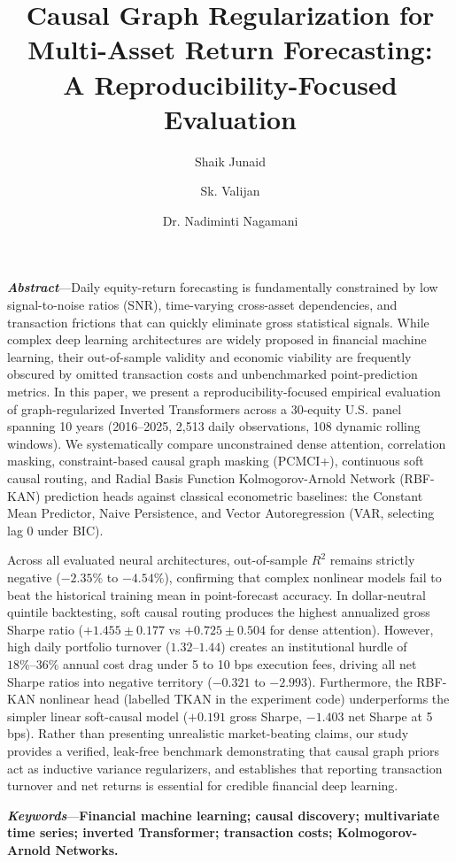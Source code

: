\documentclass[10pt,twocolumn,a4paper]{article}
\title{\fontsize{18pt}{22.5pt}\selectfont\bfseries Causal Graph Regularization for Multi-Asset Return Forecasting:\\[0.35em]\fontsize{13.5pt}{17.5pt}\selectfont\textbf{\color{navyblue}A Reproducibility-Focused Evaluation}}
\author[1]{Shaik Junaid}
\author[1]{Sk. Valijan}
\author[2]{Dr. Nadiminti Nagamani}
\affil[1]{Department of Data Science, VIT-AP University, Amaravati, Andhra Pradesh, India}
\affil[2]{School of Advanced Sciences, VIT-AP University, Amaravati, Andhra Pradesh, India}
\date{}
\begin{document}
\maketitle
\balance

\noindent\textbf{\textit{Abstract}}---Daily equity-return forecasting is fundamentally constrained by low signal-to-noise ratios (SNR), time-varying cross-asset dependencies, and transaction frictions that can quickly eliminate gross statistical signals. While complex deep learning architectures are widely proposed in financial machine learning, their out-of-sample validity and economic viability are frequently obscured by omitted transaction costs and unbenchmarked point-prediction metrics. In this paper, we present a reproducibility-focused empirical evaluation of graph-regularized Inverted Transformers across a 30-equity U.S. panel spanning 10 years (2016--2025, 2,513 daily observations, 108 dynamic rolling windows). We systematically compare unconstrained dense attention, correlation masking, constraint-based causal graph masking (PCMCI+), continuous soft causal routing, and Radial Basis Function Kolmogorov-Arnold Network (RBF-KAN) prediction heads against classical econometric baselines: the Constant Mean Predictor, Naive Persistence, and Vector Autoregression (VAR, selecting lag 0 under BIC).

Across all evaluated neural architectures, out-of-sample $R^2$ remains strictly negative ($-2.35\%$ to $-4.54\%$), confirming that complex nonlinear models fail to beat the historical training mean in point-forecast accuracy. In dollar-neutral quintile backtesting, soft causal routing produces the highest annualized gross Sharpe ratio ($+1.455 \pm 0.177$ vs $+0.725 \pm 0.504$ for dense attention). However, high daily portfolio turnover ($1.32\text{--}1.44$) creates an institutional hurdle of $18\%\text{--}36\%$ annual cost drag under 5 to 10 bps execution fees, driving all net Sharpe ratios into negative territory ($-0.321$ to $-2.993$). Furthermore, the RBF-KAN nonlinear head (labelled TKAN in the experiment code) underperforms the simpler linear soft-causal model ($+0.191$ gross Sharpe, $-1.403$ net Sharpe at 5 bps). Rather than presenting unrealistic market-beating claims, our study provides a verified, leak-free benchmark demonstrating that causal graph priors act as inductive variance regularizers, and establishes that reporting transaction turnover and net returns is essential for credible financial deep learning.

\vspace{0.35em}
\noindent\textbf{\textit{Keywords}}---\textbf{Financial machine learning; causal discovery; multivariate time series; inverted Transformer; transaction costs; Kolmogorov-Arnold Networks.}
\vspace{0.5em}
\end{document}
